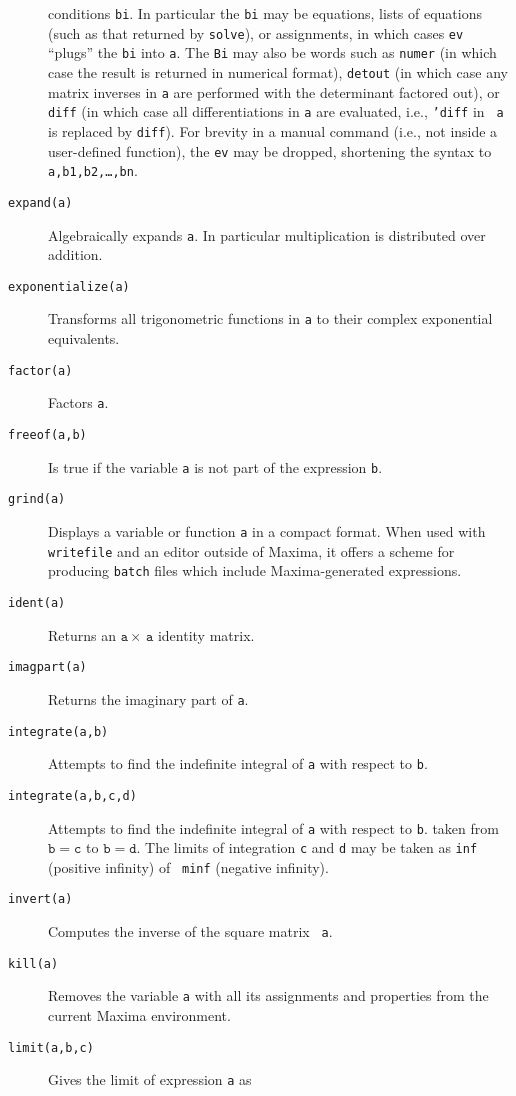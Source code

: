 \documentclass[a4paper,12pt]{article}
\begin{document}
\begin{description}
  conditions {\tt bi}.  In particular the {\tt bi} may be equations,
  lists of equations (such as that returned by {\tt solve}), or
  assignments, in which cases {\tt ev} ``plugs'' the {\tt bi} into
  {\tt a}.  The {\tt Bi} may also be words such as {\tt numer} (in
  which case the result is returned in numerical format), {\tt detout}
  (in which case any matrix inverses in {\tt a} are performed with the
  determinant factored out), or {\tt diff} (in which case all
  differentiations in {\tt a} are evaluated, i.e., {\tt 'diff} in {\tt
    a} is replaced by {\tt diff}).  For brevity in a manual command
  (i.e., not inside a user-defined function), the {\tt ev} may be
  dropped, shortening the syntax to {\tt a,b1,b2,\ldots,bn}.
\item[{\tt expand(a)}] Algebraically expands {\tt a}.  In particular
  multiplication is distributed over addition.
\item[{\tt exponentialize(a)}] Transforms all trigonometric functions
  in {\tt a} to their complex exponential equivalents.
\item[{\tt factor(a)}] Factors {\tt a}.
\item[{\tt freeof(a,b)}] Is true if the variable {\tt a} is not part
  of the expression {\tt b}.
\item[{\tt grind(a)}] Displays a variable or function {\tt a} in a
  compact format.  When used with {\tt writefile} and an editor
  outside of Maxima, it offers a scheme for producing {\tt batch}
  files which include Maxima-generated expressions.
\item[{\tt ident(a)}] Returns an $\mathtt{a} \times\, \mathtt{a}$
  identity matrix.
\item[{\tt imagpart(a)}] Returns the imaginary part of {\tt a}.
\item[{\tt integrate(a,b)}] Attempts to find the indefinite integral
  of {\tt a} with respect to {\tt b}.
\item[{\tt integrate(a,b,c,d)}] Attempts to find the indefinite
  integral of {\tt a} with respect to {\tt b}. taken from
  $\mathtt{b=c}$ to $\mathtt{b=d}$.  The limits of integration {\tt c}
  and {\tt d} may be taken as {\tt inf} (positive infinity) of {\tt
    minf} (negative infinity).
\item[{\tt invert(a)}] Computes the inverse of the square matrix {\tt
    a}.
\item[{\tt kill(a)}] Removes the variable {\tt a} with all its
  assignments and properties from the current Maxima environment.
\item[{\tt limit(a,b,c)}] Gives the limit of expression {\tt a} as

\end{description}
\end{document}
